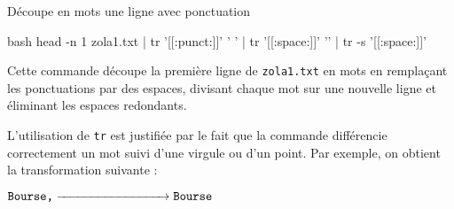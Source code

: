 \documentclass[a4paper, 14pt]{report}
\begin{document}
    \begin{Exemple}{Découpe en mots une ligne avec ponctuation}{}



    \begin{center}
  \begin{adjustbox}{max width=\linewidth}
    \begin{cminted}{bash}
head -n 1 zola1.txt | tr    '[[:punct:]]' ' ' 
                    | tr    '[[:space:]]' '\n' 
                    | tr -s '[[:space:]]'
    \end{cminted}
  \end{adjustbox}
    \end{center}
        Cette commande découpe la première ligne de \texttt{zola1.txt} en mots en 
        remplaçant les ponctuations par des espaces, divisant chaque mot sur une 
        nouvelle ligne et éliminant les espaces redondants.

        \vspace{0.5em}

        L'utilisation de \texttt{tr}  
        est justifiée par le fait que la commande différencie correctement 
        un mot suivi d'une virgule ou d'un 
        point. Par exemple, on obtient la transformation suivante :
        \begin{center}
            \( \texttt{Bourse,} \xrightarrow{\hspace*{3cm}} \texttt{Bourse}\)
        \end{center}
        \hfill
    \end{Exemple}
\end{document}
